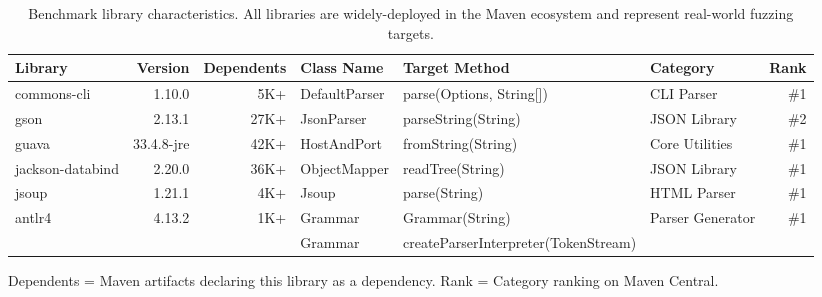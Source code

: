 \begin{table*}[t]
\caption{Benchmark library characteristics. All libraries are widely-deployed in the Maven ecosystem and represent real-world fuzzing targets.}
\centering
\setlength{\tabcolsep}{3pt}
\renewcommand{\arraystretch}{1.1}
\small
\begin{tabular}{l r r l l l r}
\toprule
\textbf{Library} & \textbf{Version} & \textbf{Dependents} & \textbf{Class Name} & \textbf{Target Method} & \textbf{Category} & \textbf{Rank} \\
\midrule
commons-cli      & 1.10.0     & 5K+  & DefaultParser        & parse(Options, String[])              & CLI Parser       & \#1 \\
gson             & 2.13.1     & 27K+ & JsonParser           & parseString(String)                   & JSON Library     & \#2 \\
guava            & 33.4.8-jre & 42K+ & HostAndPort          & fromString(String)                    & Core Utilities   & \#1 \\
jackson-databind & 2.20.0     & 36K+ & ObjectMapper         & readTree(String)                      & JSON Library     & \#1 \\
jsoup            & 1.21.1     & 4K+  & Jsoup                & parse(String)                         & HTML Parser      & \#1 \\
\midrule
\multirow{2}{*}{antlr4} & \multirow{2}{*}{4.13.2} & \multirow{2}{*}{1K+} & Grammar & Grammar(String) & \multirow{2}{*}{Parser Generator} & \multirow{2}{*}{\#1} \\[-.9pt]
                &            &      & Grammar              & createParserInterpreter(TokenStream)  &                  &      \\
\bottomrule
\end{tabular}
\smallskip
\begin{flushleft}
\footnotesize
Dependents = Maven artifacts declaring this library as a dependency. Rank = Category ranking on Maven Central.
\end{flushleft}
\vspace{-3mm}
\label{tab:benchmarks}
\end{table*}
